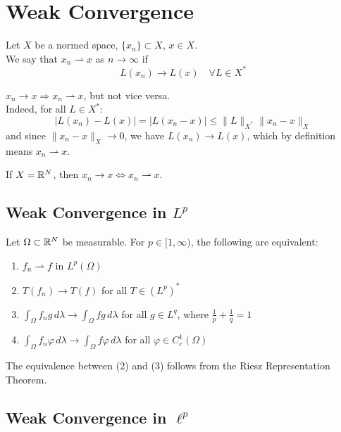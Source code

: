 \section{Weak Convergence}

\begin{definition}
Let $X$ be a normed space, $\{x_n\} \subset X$, $x \in X$. \\
We say that $x_n \rightharpoonup x$ as $n \to \infty$ if 
\[
L(x_n) \to L(x) \quad \forall L \in X^*
\]
\end{definition}

\begin{remark}
$x_n \to x \Rightarrow x_n \rightharpoonup x$, but not vice versa. \\
Indeed, for all $L \in X^*$:
\[
|L(x_n) - L(x)| = |L(x_n - x)| \leq \|L\|_{X^*} \|x_n - x\|_X
\]
and since $\|x_n - x\|_X \to 0$, we have $L(x_n) \to L(x)$, which by definition means $x_n \rightharpoonup x$.
\end{remark}

\begin{remark}
If $X = \mathbb{R}^N$, then $x_n \to x \iff x_n \rightharpoonup x$.
\end{remark}

\subsection{Weak Convergence in $L^p$}

\begin{theorem}
Let $\Omega \subset \mathbb{R}^N$ be measurable. For $p \in [1,\infty)$, the following are equivalent:
\begin{enumerate}
\item $f_n \rightharpoonup f$ in $L^p(\Omega)$
\item $T(f_n) \to T(f)$ for all $T \in (L^p)^*$
\item $\int_{\Omega} f_n g \, d\lambda \to \int_{\Omega} f g \, d\lambda$ for all $g \in L^q$, where $\frac{1}{p} + \frac{1}{q} = 1$
\item $\int_{\Omega} f_n \varphi \, d\lambda \to \int_{\Omega} f \varphi \, d\lambda$ for all $\varphi \in C_c^1(\Omega)$
\end{enumerate}
The equivalence between (2) and (3) follows from the Riesz Representation Theorem.
\end{theorem}

\subsection{Weak Convergence in $\ell^p$}

